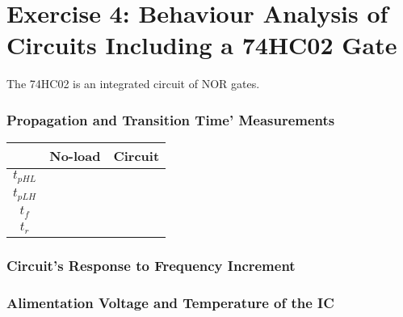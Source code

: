 \documentclass[a4paper,11pt]{report}
\begin{document}
\section{\color{olive}Exercise 4: Behaviour Analysis of Circuits Including a 74HC02 Gate}

The 74HC02 is an integrated circuit of NOR gates.

\subsubsection{\color{red}Propagation and Transition Time' Measurements}

\begin{tabular}{|c|c|c|}
\hline
 &No-load & Circuit \\ %
\hline
\hline
$t_{pHL}$ & &  \\
\hline
$t_{pLH}$ &  & \\
\hline
$t_{f}$ &  & \\
\hline
$t_{r}$ & & \\
\hline
\end{tabular}


\subsubsection{\color{red}Circuit's Response to Frequency Increment}


\subsubsection{\color{red}Alimentation Voltage and Temperature of the IC}
\end{document}
